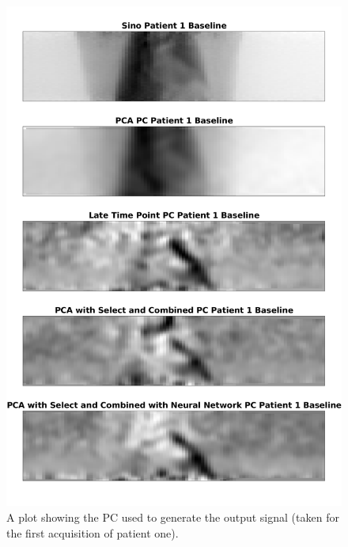     \begin{figure}
        \centering
    
        \includegraphics[width=1.0\linewidth]{figures/patient_one_pc_output.png}    
    
        
        \captionsetup{singlelinecheck=false, justification=centering}
        \caption{
        A plot showing the \gls{PC} used to generate the output signal (taken for the first acquisition of patient one).}
    
        \label{fig:patient_one_pc_output}
    
    \end{figure}
    
